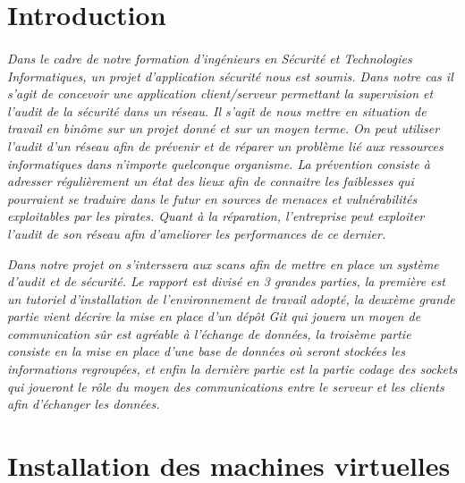 \documentclass[11pt,a4paper,titlepage, oneside]{article}
\begin{document}
\section*{{\color{red}Introduction}}
	\paragraph{}
\textsl{Dans le cadre de notre formation d'ingénieurs en Sécurité et Technologies Informatiques, un projet d'application sécurité nous est soumis. Dans notre cas il s'agit de concevoir une application client/serveur permettant la supervision et l'audit de la sécurité dans un réseau. Il s'agit de nous mettre en situation de travail en binôme  sur un projet donné et sur un moyen terme. 
On peut utiliser l'audit d'un réseau afin de prévenir et de réparer un problème lié aux ressources informatiques dans n'importe quelconque organisme. La prévention consiste à adresser régulièrement un état des lieux afin de connaitre les faiblesses qui pourraient se traduire dans le futur en sources de menaces et vulnérabilités exploitables par les pirates.
Quant à la réparation, l'entreprise peut exploiter l'audit de son réseau afin d'ameliorer les performances de ce dernier. 	}	

\textsl{
Dans notre projet on s'interssera aux scans afin de mettre en place un système d'audit et de sécurité.
Le rapport est divisé en 3 grandes parties, la première est un tutoriel d'installation de l'environnement de travail adopté, la deuxème grande partie vient décrire la mise en place d'un dépôt Git qui jouera un moyen de communication sûr est agréable à l'échange de données, la troisème partie consiste en la mise en place d'une base de données où seront stockées les informations regroupées, et enfin la dernière partie est la partie codage des sockets qui joueront le rôle du moyen des communications entre le serveur et les clients afin d'échanger les données.}
		
\newpage
\thispagestyle{empty}
\tableofcontents
\newpage
\listoffigures 

\newpage
{} \setcounter{page}{1}
\section{{\color{red}Installation des machines virtuelles}}
\subsection{{\color{blue}{Installation du serveur Debian}}}
\end{document}
